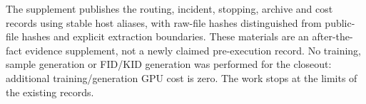 The supplement publishes the routing, incident, stopping, archive and cost records using stable host aliases, with raw-file hashes distinguished from public-file hashes and explicit extraction boundaries. These materials are an after-the-fact evidence supplement, not a newly claimed pre-execution record. No training, sample generation or FID/KID generation was performed for the closeout: additional training/generation GPU cost is zero. The work stops at the limits of the existing records.
